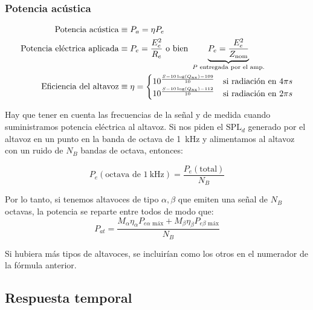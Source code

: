 \documentclass[a4paper, 8pt]{extarticle}
\begin{document}
\begin{multicols}{3}
  \subsubsection{Potencia acústica}

  \begin{align*}
    \text{Potencia acústica}           & \equiv P_a = \eta P_e                                                                                                                        \\
    \text{Potencia eléctrica aplicada} & \equiv P_e = \frac{E^2_{e}}{R_e} \ \text{o bien} \  \underbrace{P_e = \frac{E^2_e}{Z _{\textnormal{nom}}}}_{P \text{ entregada por el amp.}} \\
    \text{Eficiencia del altavoz}      & \equiv \eta = \left\lbrace
    \begin{matrix*}[l]
      10^{\frac{S - 10 \log \left( Q _{\textnormal{ax}} \right) -109 }{10}} & \text{si radiación en }4\pi s \\
      10^{\frac{S - 10 \log \left( Q _{\textnormal{ax}} \right) -112 }{10}} & \text{si radiación en }2\pi s \\
    \end{matrix*} \right.                                                                                                                      \\
  \end{align*}

  Hay que tener en cuenta las frecuencias de la señal y de medida cuando suministramos potencia eléctrica al altavoz. Si nos piden el $\text{SPL}_d$ generado por el altavoz en un punto en la banda de octava de \qty{1}{\kilo \hertz } y alimentamos al altavoz con un ruido de $N_B$ bandas de octava, entonces:

  \[ P_e \left( \text{octava de } \qty{1}{\kilo \hertz } \right) = \frac{P_{e} \left( \text{total} \right)}{N_B} \]

  Por lo tanto, si tenemos altavoces de tipo $\alpha, \beta$ que emiten una señal de $N_B$ octavas, la potencia se reparte entre todos de modo que:
  \[ P_{at} = \frac{M_{\alpha}\eta_{\alpha}P_{e\alpha \text{ máx}} + M_{\beta}\eta_{\beta}P_{e\beta \text{ máx}} }{N_B} \]

  Si hubiera más tipos de altavoces, se incluirían como los otros en el numerador de la fórmula anterior.


  \subsection{Respuesta temporal}

\end{multicols}
\end{document}
